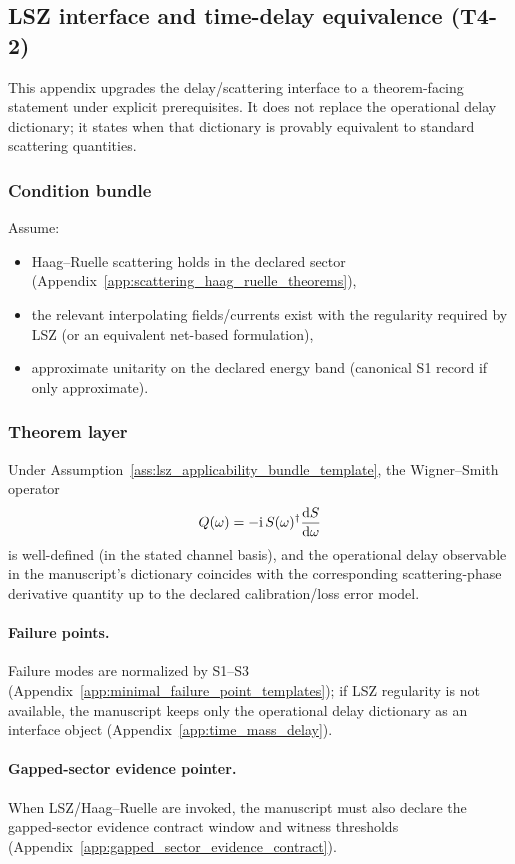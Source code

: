 \subsection{LSZ interface and time-delay equivalence (T4-2)}
\label{app:lsz_delay_theorem_layer}

\AuditTag This appendix upgrades the delay/scattering interface to a theorem-facing statement under explicit prerequisites.
It does not replace the operational delay dictionary; it states when that dictionary is provably equivalent to standard scattering quantities.

\subsubsection{Condition bundle}
\begin{assumption}
\label{ass:lsz_applicability_bundle_template}
Assume:
\begin{itemize}
\item Haag--Ruelle scattering holds in the declared sector (Appendix~\ref{app:scattering_haag_ruelle_theorems}),
\item the relevant interpolating fields/currents exist with the regularity required by LSZ (or an equivalent net-based formulation),
\item approximate unitarity on the declared energy band (canonical S1 record if only approximate).
\end{itemize}
\end{assumption}

\subsubsection{Theorem layer}
\begin{theorem}
\label{thm:delay_from_phase_template}
\MathTag Under Assumption~\ref{ass:lsz_applicability_bundle_template}, the Wigner--Smith operator
\[
Q(\omega)=-\mathrm{i}\,S(\omega)^\dagger \frac{\mathrm{d} S}{\mathrm{d} \omega}
\]
is well-defined (in the stated channel basis), and the operational delay observable in the manuscript's dictionary coincides with the corresponding scattering-phase derivative quantity up to the declared calibration/loss error model.
\end{theorem}

\paragraph{Failure points.}
\AuditTag Failure modes are normalized by S1--S3 (Appendix~\ref{app:minimal_failure_point_templates}); if LSZ regularity is not available, the manuscript keeps only the operational delay dictionary as an interface object (Appendix~\ref{app:time_mass_delay}).

\paragraph{Gapped-sector evidence pointer.}
\AuditTag When LSZ/Haag--Ruelle are invoked, the manuscript must also declare the gapped-sector evidence contract window and witness thresholds (Appendix~\ref{app:gapped_sector_evidence_contract}).
